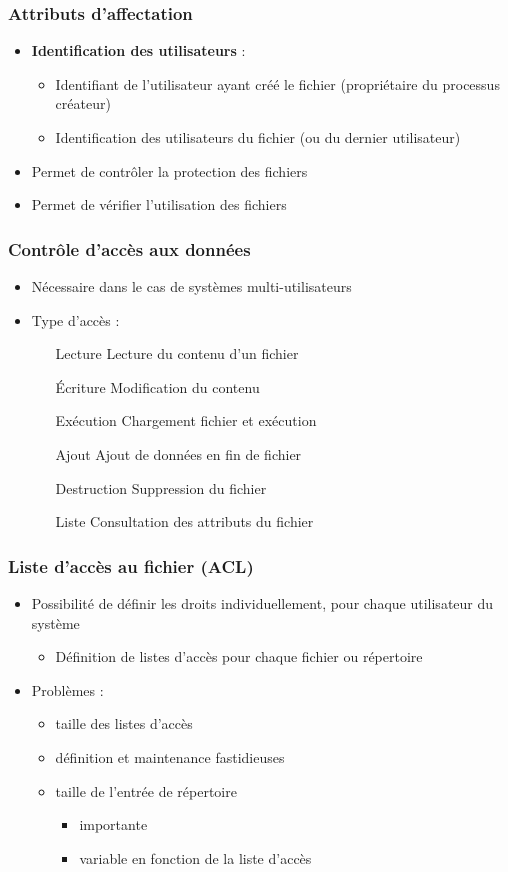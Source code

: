 \begin{frame}
\frametitle{Attributs d'affectation}
\begin{itemize}
\item \textbf{Identification des utilisateurs} :
\begin{itemize}
\item Identifiant de l'utilisateur ayant créé le fichier (propriétaire du processus créateur)
\item Identification des utilisateurs du fichier (ou du dernier utilisateur)
\end{itemize}
\item Permet de contrôler la protection des fichiers
\item Permet de vérifier l'utilisation des fichiers
\end{itemize}
\end{frame}


\begin{frame}
\frametitle{Contrôle d'accès aux données}
\begin{itemize}
\item Nécessaire dans le cas de systèmes multi-utilisateurs
\item Type d'accès :
\begin{itemize}
\item [Lecture] Lecture du contenu d'un fichier
\item [Écriture] Modification du contenu
\item [Exécution] Chargement fichier et exécution
\item [Ajout] Ajout de données en fin de fichier
\item [Destruction] Suppression du fichier
\item [Liste] Consultation des attributs du fichier
\end{itemize}
\end{itemize}
\end{frame}

\begin{frame}
\frametitle{Liste d'accès au fichier (ACL)}
\begin{itemize}
\item Possibilité de définir les droits individuellement, pour chaque utilisateur du système
\begin{itemize}
\item Définition de listes d'accès pour chaque fichier ou répertoire
\end{itemize}
\item Problèmes :
\begin{itemize}
\item taille des listes d'accès
\item définition et maintenance fastidieuses
\item taille de l'entrée de répertoire
  \begin{itemize}
    \item importante
    \item variable en fonction de la liste d'accès
  \end{itemize}
\end{itemize}
\end{itemize}
\end{frame}

